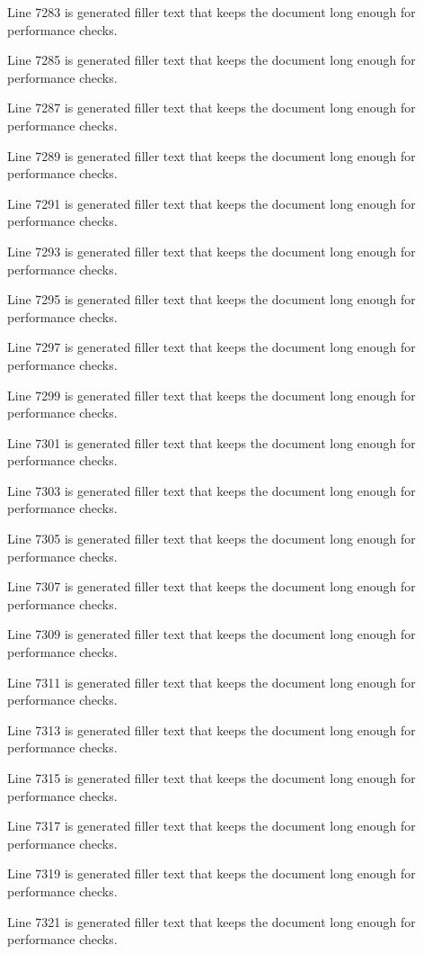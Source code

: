Line 7283 is generated filler text that keeps the document long enough for performance checks.

Line 7285 is generated filler text that keeps the document long enough for performance checks.

Line 7287 is generated filler text that keeps the document long enough for performance checks.

Line 7289 is generated filler text that keeps the document long enough for performance checks.

Line 7291 is generated filler text that keeps the document long enough for performance checks.

Line 7293 is generated filler text that keeps the document long enough for performance checks.

Line 7295 is generated filler text that keeps the document long enough for performance checks.

Line 7297 is generated filler text that keeps the document long enough for performance checks.

Line 7299 is generated filler text that keeps the document long enough for performance checks.

Line 7301 is generated filler text that keeps the document long enough for performance checks.

Line 7303 is generated filler text that keeps the document long enough for performance checks.

Line 7305 is generated filler text that keeps the document long enough for performance checks.

Line 7307 is generated filler text that keeps the document long enough for performance checks.

Line 7309 is generated filler text that keeps the document long enough for performance checks.

Line 7311 is generated filler text that keeps the document long enough for performance checks.

Line 7313 is generated filler text that keeps the document long enough for performance checks.

Line 7315 is generated filler text that keeps the document long enough for performance checks.

Line 7317 is generated filler text that keeps the document long enough for performance checks.

Line 7319 is generated filler text that keeps the document long enough for performance checks.

Line 7321 is generated filler text that keeps the document long enough for performance checks.

